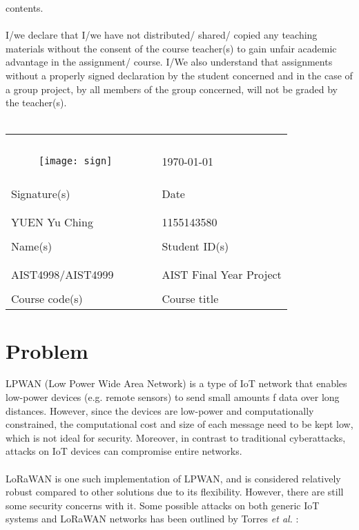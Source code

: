 \documentclass{article}
\newcommand{\hmwkClass}{AIST4998/AIST4999}
\newcommand{\hmwkClassTime}{}
\newcommand{\hmwkClassTitle}{AIST Final Year Project}
\newcommand{\hmwkAuthorName}{YUEN Yu Ching}
\newcommand{\hmwkAuthorSID}{1155143580}
\begin{document}
{{{contents.
}\\
\\
I/we declare that I/we have not distributed/ shared/ copied any teaching materials without the consent
of the course teacher(s) to gain unfair academic advantage in the assignment/ course.
I/We also understand that assignments without a properly signed declaration by the student concerned
and in the case of a group project, by all members of the group concerned, will not be graded by the
teacher(s).\\
\\
\begin{tabular}{p{}p{}p{}}
 && \\
 && \\
\begin{minipage}{0.2\textwidth}\begin{figure}[H]\texttt{[image: sign]}\end{figure}\end{minipage} && \today\\
\hrulefill&&\hrulefill\\
Signature(s) && Date\\
 && \\
 && \\
\hmwkAuthorName && \hmwkAuthorSID\\
\hrulefill&&\hrulefill\\
Name(s) && Student ID(s)\\
 && \\
 && \\
\hmwkClass\hmwkClassTime && \hmwkClassTitle\\
\hrulefill && \hrulefill\\
Course code(s) && Course title\\
\end{tabular}
}}

\pagebreak
\fancyhead[R]{\rightmark}

\section{Problem}
LPWAN (Low Power Wide Area Network) is a type of IoT network that enables low-power devices (e.g. remote sensors) to send small amounts f data over long distances. However, since the devices are low-power and computationally constrained, the computational cost and size of each message need to be kept low, which is not ideal for security. Moreover, in contrast to traditional cyberattacks, attacks on IoT devices can compromise entire networks.\\
\\
LoRaWAN is one such implementation of LPWAN, and is considered relatively robust compared to other solutions \cite{ref1} due to its flexibility. However, there are still some security concerns with it. Some possible attacks on both generic IoT systems and LoRaWAN networks has been outlined by Torres \textit{et al.} \cite{ref2}:
\end{document}
